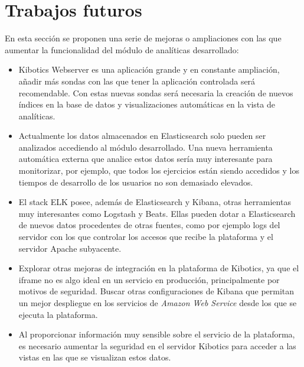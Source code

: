 \documentclass[a4paper, 12pt]{book}
\begin{document}
	\section{Trabajos futuros} 
	\label{sec:trabajos_futuros} 

		En esta sección se proponen una serie de mejoras o ampliaciones con las que aumentar la funcionalidad del módulo de analíticas desarrollado:

		\begin{itemize}
			\item Kibotics Webserver es una aplicación grande y en constante ampliación, añadir más sondas con las que tener la aplicación controlada será recomendable. Con estas nuevas sondas será necesaria la creación de nuevos índices en la base de datos y visualizaciones automáticas en la vista de analíticas.\\
			
			\item Actualmente los datos almacenados en Elasticsearch solo pueden ser analizados accediendo al módulo desarrollado. Una nueva herramienta automática externa que analice estos datos sería muy interesante para monitorizar, por ejemplo, que todos los ejercicios están siendo accedidos y los tiempos de desarrollo de los usuarios no son demasiado elevados.\\
			
			\item El stack ELK posee, además de Elasticsearch y Kibana, otras herramientas muy interesantes como Logstash y Beats. Ellas pueden dotar a Elasticsearch de nuevos datos procedentes de otras fuentes, como por ejemplo logs del servidor con los que controlar los accesos que recibe la plataforma y el servidor Apache subyacente. \\
			
			\item Explorar otras mejoras de integración en la plataforma de Kibotics, ya que el iframe no es algo ideal en un servicio en producción, principalmente por motivos de seguridad. Buscar otras configuraciones de Kibana que permitan un mejor despliegue en los servicios de \textit{Amazon Web Service} desde los que se ejecuta la plataforma.\\
						
			\item Al proporcionar información muy sensible sobre el servicio de la plataforma, es necesario aumentar la seguridad en el servidor Kibotics para acceder a las vistas en las que se visualizan estos datos.\\
		\end{itemize}
\end{document}
